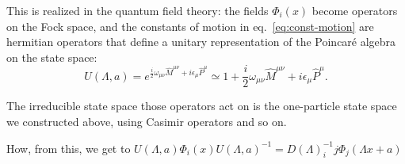 This is realized in the quantum field theory: the fields $\Phi_i(x)$ become operators on the Fock space, and the constants of motion in eq.~\eqref{eq:const-motion} are hermitian operators that define a unitary representation of the Poincaré algebra on the state space:
\begin{equation}
    U(\Lambda,a) = e^{\frac{i}{2} \omega_{\mu\nu} \hat{M}^{\mu\nu} + i \epsilon_\mu \hat{P}^\mu} \simeq 1 + \frac{i}{2} \omega_{\mu\nu} \hat{M}^{\mu\nu} + i \epsilon_\mu \hat{P}^\mu .
\end{equation}

The irreducible state space those operators act on is the one-particle state space we constructed above, using Casimir operators and so on.

\color{red} How, from this, we get to $U(\Lambda,a) \Phi_i(x) U(\Lambda,a)^{-1} = D(\Lambda)^{-1}_ij \Phi_j (\Lambda x + a)$
\color{black}